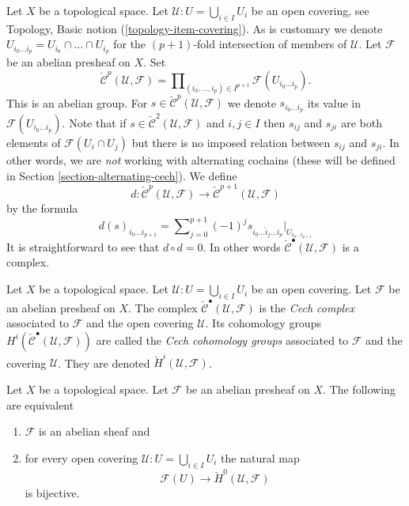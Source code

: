 \noindent
Let $X$ be a topological space.
Let $\mathcal{U} : U = \bigcup_{i \in I} U_i$ be an open covering,
see Topology, Basic notion (\ref{topology-item-covering}).
As is customary we denote
$U_{i_0\ldots i_p} = U_{i_0} \cap \ldots \cap U_{i_p}$ for the
$(p + 1)$-fold intersection of members of $\mathcal{U}$.
Let $\mathcal{F}$ be an abelian presheaf on $X$.
Set
$$
\check{\mathcal{C}}^p(\mathcal{U}, \mathcal{F})
=
\prod\nolimits_{(i_0, \ldots, i_p) \in I^{p + 1}}
\mathcal{F}(U_{i_0\ldots i_p}).
$$
This is an abelian group. For
$s \in \check{\mathcal{C}}^p(\mathcal{U}, \mathcal{F})$ we denote
$s_{i_0\ldots i_p}$ its value in $\mathcal{F}(U_{i_0\ldots i_p})$.
Note that if $s \in \check{\mathcal{C}}^2(\mathcal{U}, \mathcal{F})$
and $i, j \in I$ then $s_{ij}$ and $s_{ji}$ are both elements
of $\mathcal{F}(U_i \cap U_j)$ but there is no imposed
relation between $s_{ij}$ and $s_{ji}$. In other words, we are {\it not}
working with alternating cochains (these will be defined
in Section \ref{section-alternating-cech}). We define
$$
d : \check{\mathcal{C}}^p(\mathcal{U}, \mathcal{F})
\longrightarrow
\check{\mathcal{C}}^{p + 1}(\mathcal{U}, \mathcal{F})
$$
by the formula
\begin{equation}
\label{equation-d-cech}
d(s)_{i_0\ldots i_{p + 1}}
=
\sum\nolimits_{j = 0}^{p + 1}
(-1)^j
s_{i_0\ldots \hat i_j \ldots i_p}|_{U_{i_0\ldots i_{p + 1}}}
\end{equation}
It is straightforward to see that $d \circ d = 0$. In other words
$\check{\mathcal{C}}^\bullet(\mathcal{U}, \mathcal{F})$ is a complex.

\begin{definition}
\label{definition-cech-complex}
Let $X$ be a topological space.
Let $\mathcal{U} : U = \bigcup_{i \in I} U_i$ be an open covering.
Let $\mathcal{F}$ be an abelian presheaf on $X$.
The complex $\check{\mathcal{C}}^\bullet(\mathcal{U}, \mathcal{F})$
is the {\it Cech complex} associated to $\mathcal{F}$ and the
open covering $\mathcal{U}$. Its cohomology groups
$H^i(\check{\mathcal{C}}^\bullet(\mathcal{U}, \mathcal{F}))$ are
called the {\it Cech cohomology groups} associated to
$\mathcal{F}$ and the covering $\mathcal{U}$.
They are denoted $\check H^i(\mathcal{U}, \mathcal{F})$.
\end{definition}

\begin{lemma}
\label{lemma-cech-h0}
Let $X$ be a topological space.
Let $\mathcal{F}$ be an abelian presheaf on $X$.
The following are equivalent
\begin{enumerate}
\item $\mathcal{F}$ is an abelian sheaf and
\item for every open covering $\mathcal{U} : U = \bigcup_{i \in I} U_i$
the natural map
$$
\mathcal{F}(U) \to \check{H}^0(\mathcal{U}, \mathcal{F})
$$
is bijective.
\end{enumerate}
\end{lemma}

